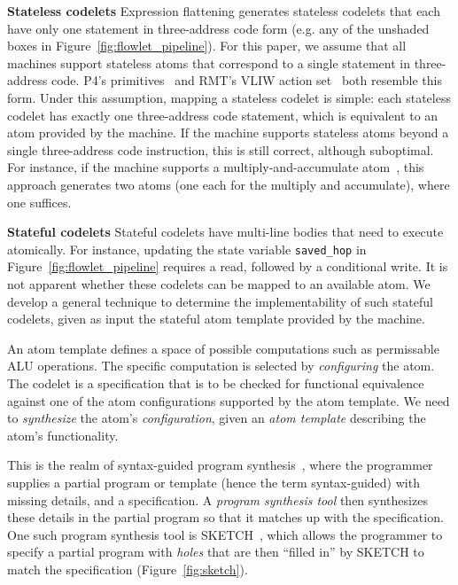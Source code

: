 \textbf{Stateless codelets}
Expression flattening generates stateless codelets that each have only one
statement in three-address code form (e.g. any of the unshaded boxes in
Figure~\ref{fig:flowlet_pipeline}). For this paper, we assume that all \absmachine
machines support stateless atoms that correspond to a single statement in
three-address code. P4's primitives~\cite{p4spec} and RMT's VLIW action
set~\cite{rmt} both resemble this form. Under this assumption, mapping a
stateless codelet is simple: each stateless codelet has exactly one
three-address code statement, which is equivalent to an atom provided by the
\absmachine machine. If the \absmachine machine supports stateless atoms beyond
a single three-address code instruction, this is still correct, although
suboptimal. For instance, if the \absmachine machine supports a
multiply-and-accumulate atom~\cite{mac}, this approach generates two atoms (one
each for the multiply and accumulate), where one suffices.

\textbf{Stateful codelets}
Stateful codelets have multi-line bodies that need to execute atomically. For
instance, updating the state variable \texttt{saved\_hop} in
Figure~\ref{fig:flowlet_pipeline} requires a read, followed by a conditional write.  It
is not apparent whether these codelets can be mapped to an available atom. We
develop a general technique to determine the implementability of such stateful
codelets, given as input the stateful atom template provided by the \absmachine
machine.

An atom template defines a space of possible computations such as
permissable ALU operations.  The specific computation is selected by
\textit{configuring} the atom. The codelet is a specification that is to be
checked for functional equivalence against one of the atom configurations
supported by the atom template. We need to \textit{synthesize} the atom's
\textit{configuration}, given an \textit{atom template} describing the atom's
functionality.

This is the realm of syntax-guided program synthesis~\cite{sgsyn}, where the
programmer supplies a partial program or template (hence the term
syntax-guided) with missing details, and a specification. A \textit{program
synthesis tool} then synthesizes these details in the partial program so that
it matches up with the specification. One such program synthesis tool is
SKETCH~\cite{bitstreaming, sketch_asplos, sketch_manual}, which allows the
programmer to specify a partial program with \textit{holes} that are then
``filled in'' by SKETCH to match the specification (Figure~\ref{fig:sketch}).

